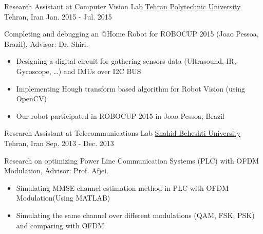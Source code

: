 \begin{cventries}
  \cventry
    {Research Assistant at Computer Vision Lab} %
    {\href{http://aut.ac.ir/aut/}{Tehran Polytechnic University}} %
    {Tehran, Iran} %
    {Jan. 2015 - Jul. 2015} %
    {
      \begin{cvitems} %
        \item Completing and debugging an @Home Robot for ROBOCUP 2015 (Joao Pessoa, Brazil), Advisor: Dr. Shiri.
        \begin{itemize}
        \item Designing a digital circuit for gathering sensors data (Ultrasound, IR, Gyroscope, …) and IMUs over I2C BUS 
        \item Implementing Hough transform based algorithm for Robot Vision (using OpenCV)
        \item Our robot participated in ROBOCUP 2015 in Joao Pessoa, Brazil
        \end{itemize}
      \end{cvitems}
    }

  \cventry
    {Research Assistant at Telecommunications Lab} %
    {\href{http://en.sbu.ac.ir/sitepages/home.aspx}{Shahid Beheshti University}} %
    {Tehran, Iran} %
    {Sep. 2013 - Dec. 2013} %
    {
      \begin{cvitems} %
        \item Research on optimizing Power Line Communication Systems (PLC) with OFDM Modulation, Advisor: Prof. Afjei.
        \begin{itemize}
        		\item Simulating MMSE channel estimation method in PLC with OFDM Modulation(Using MATLAB)
        		\item Simulating the same channel over different modulations (QAM, FSK, PSK) and comparing with OFDM
        \end{itemize}
      \end{cvitems}
    }


\end{cventries}
